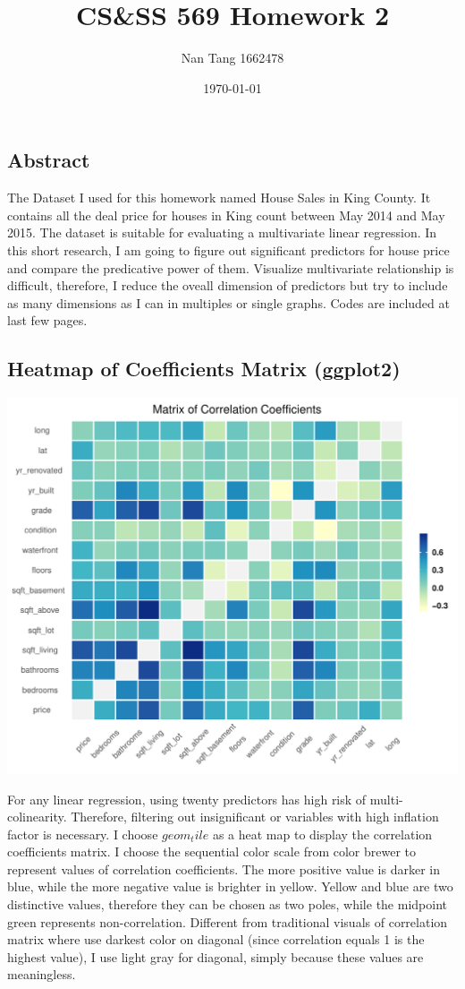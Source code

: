 \documentclass[11pt,letterpaper]{article}
\title{CS\&SS 569 Homework 2}
\author{Nan Tang 1662478}
\date{\today}
\begin{document}
\maketitle
 
\subsection*{Abstract}
The Dataset I used for this homework named House Sales in King County. It contains all the deal price for houses in King count between May 2014 and May 2015. The dataset is suitable for evaluating a multivariate linear regression. In this short research, I am going to figure out significant predictors for house price and compare the predicative power of them. Visualize multivariate relationship is difficult, therefore, I reduce the oveall dimension of predictors but try to include as many dimensions as I can in multiples or single graphs. Codes are included at last few pages. 

\subsection*{Heatmap of Coefficients Matrix (ggplot2)}
\includegraphics[scale=0.8]{HW2-1.pdf}

\noindent For any linear regression, using twenty predictors has high risk of multi-colinearity. Therefore, filtering out insignificant or variables with high inflation factor is necessary. I choose $geom_tile$ as a heat map to display the correlation coefficients matrix. I choose the sequential color scale from color brewer to represent values of correlation coefficients. The more positive value is darker in blue, while the more negative value is brighter in yellow. Yellow and blue are two distinctive values, therefore they can be chosen as two poles, while the midpoint green represents non-correlation. Different from traditional visuals of correlation matrix where use darkest color on diagonal (since correlation equals 1 is the highest value), I use light gray for diagonal, simply because these values are meaningless. \\
\end{document}
